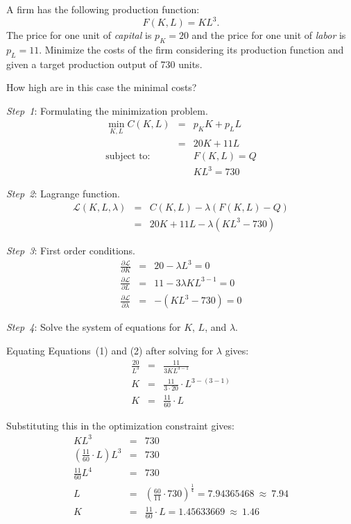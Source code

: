 

\begin{question}
A firm has the following production function: \[F(K,L)= K L^{3}.\]
The price for one unit of \emph{capital} is $p_K = 20$ 
and the price for one unit of \emph{labor} is $p_L = 11$.
Minimize the costs of the firm considering its production function and given a target production output of 730 units.

How high are in this case the minimal costs?
\end{question}

\begin{solution}
\emph{Step~1}: Formulating the minimization problem.
\begin{eqnarray*}
\min_{K,L} C(K,L) &=& p_K K + p_L L\\
 &=& 20 K + 11 L\\
\mbox{subject to:} &&  F(K,L) = Q \\
&& K L^{3} = 730 
\end{eqnarray*}

\emph{Step~2}: Lagrange function.
\begin{eqnarray*}
\mathcal{L}(K, L, \lambda) &=& C(K, L)-\lambda (F(K, L) - Q) \\
&=& 20 K + 11 L - \lambda (K L^{3} -730)
\end{eqnarray*}

\emph{Step~3}: First order conditions.
\begin{eqnarray}
\frac{\partial {\mathcal {L}}}{\partial K} & = & 20 - \lambda L^{3} = 0\\
\frac{\partial {\mathcal {L}}}{\partial L} & = & 11 - {3} \lambda K L^{3-1} = 0 \\
\frac{\partial {\mathcal {L}}}{\partial \lambda} & = & -(K L^{3}-730) = 0
\end{eqnarray}

\emph{Step~4}: Solve the system of equations for $K$, $L$, and $\lambda$.

Equating Equations~(1) and (2) after solving for $\lambda$ gives:
\begin{eqnarray*}
\frac{20}{L^{3}} & = & \frac{11}{{3} K L^{3-1}}\\
K & = & \frac{11}{3 \cdot 20} \cdot L^{3 - (3 -1)}\\
K & = & \frac{11}{60} \cdot L
\end{eqnarray*}

Substituting this in the optimization constraint gives:
\begin{eqnarray*}
K L^{3} & = & 730\\
\left(\frac{11}{60}\cdot L \right) L^{3} & = & 730\\
\frac{11}{60} L^{4} & = & 730\\
L & = & \left(\frac{60}{11} \cdot 
730\right)^{\frac{1}{4}} = 7.94365468~\approx~7.94\\
K & = & \frac{11}{60} \cdot L = 1.45633669~\approx~1.46
\end{eqnarray*}


\end{solution}

